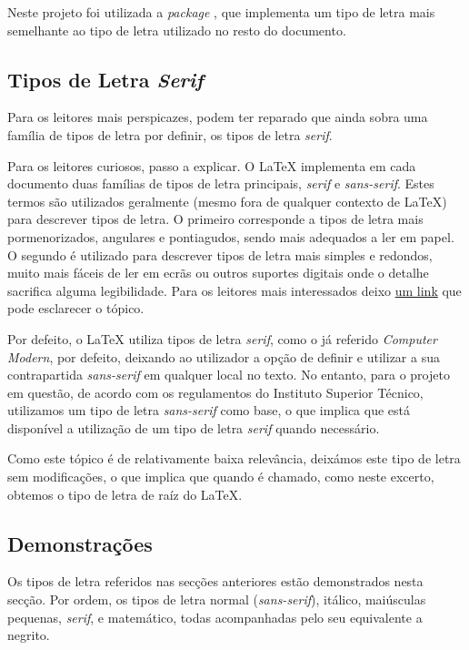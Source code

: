 \documentclass{../ist-thesis}
\begin{document}
Neste projeto foi utilizada a \textit{package} , que implementa um tipo de letra mais semelhante ao tipo de letra utilizado no resto do documento.

\subsection{Tipos de Letra \textit{Serif}}

Para os leitores mais perspicazes, podem ter reparado que ainda sobra uma família de tipos de letra por definir, os tipos de letra \textit{serif}.

Para os leitores curiosos, passo a explicar. O \LaTeX{} implementa em cada documento duas famílias de tipos de letra principais, \textit{serif} e \textit{sans-serif}. Estes termos são utilizados geralmente (mesmo fora de qualquer contexto de \LaTeX{}) para descrever tipos de letra. O primeiro corresponde a tipos de letra mais pormenorizados, angulares e pontiagudos, sendo mais adequados a ler em papel. O segundo é utilizado para descrever tipos de letra mais simples e redondos, muito mais fáceis de ler em ecrãs ou outros suportes digitais onde o detalhe sacrifica alguma legibilidade. Para os leitores mais interessados deixo \href{https://en.wikipedia.org/wiki/Serif}{um link} que pode esclarecer o tópico.

Por defeito, o \LaTeX{} utiliza tipos de letra \textit{serif}, como o já referido \textit{Computer Modern}, por defeito, deixando ao utilizador a opção de definir e utilizar a sua contrapartida \textit{sans-serif} em qualquer local no texto. No entanto, para o projeto em questão, de acordo com os regulamentos do Instituto Superior Técnico, utilizamos um tipo de letra \textit{sans-serif} como base, o que implica que está disponível a utilização de um tipo de letra \textit{serif} quando necessário.

Como este tópico é de relativamente baixa relevância, deixámos este tipo de letra sem modificações, o que implica que quando é chamado, \textrm{como neste excerto}, obtemos o tipo de letra de raíz do \LaTeX{}.

\subsection{Demonstrações}

Os tipos de letra referidos nas secções anteriores estão demonstrados nesta secção. Por ordem, os tipos de letra normal (\textit{sans-serif}), itálico, maiúsculas pequenas, \textit{serif}, e matemático, todas acompanhadas pelo seu equivalente a negrito.
\end{document}
